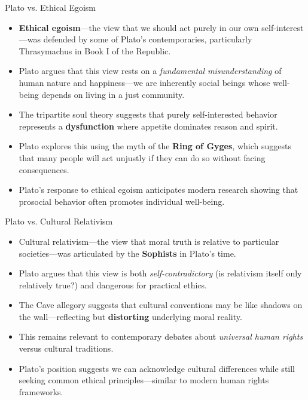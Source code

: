 \documentclass[aspectratio=169]{beamer}
\begin{document}
\begin{frame}{Plato vs. Ethical Egoism}
\begin{itemize}
\item \textbf{Ethical egoism}—the view that we should act purely in our own self-interest—was defended by some of Plato's contemporaries, particularly Thrasymachus in Book I of the Republic.
\item Plato argues that this view rests on a \emph{fundamental misunderstanding} of human nature and happiness—we are inherently social beings whose well-being depends on living in a just community.
\item The tripartite soul theory suggests that purely self-interested behavior represents a \textbf{dysfunction} where appetite dominates reason and spirit.
\item Plato explores this using the myth of the \textbf{Ring of Gyges}, which suggests that many people will act unjustly if they can do so without facing consequences.
\item Plato's response to ethical egoism anticipates modern research showing that prosocial behavior often promotes individual well-being.
\end{itemize}
\end{frame}

\begin{frame}{Plato vs. Cultural Relativism}
\begin{itemize}
\item Cultural relativism—the view that moral truth is relative to particular societies—was articulated by the \textbf{Sophists} in Plato's time.
\item Plato argues that this view is both \emph{self-contradictory} (is relativism itself only relatively true?) and dangerous for practical ethics.
\item The Cave allegory suggests that cultural conventions may be like shadows on the wall—reflecting but \textbf{distorting} underlying moral reality.
\item This remains relevant to contemporary debates about \emph{universal human rights} versus cultural traditions.
\item Plato's position suggests we can acknowledge cultural differences while still seeking common ethical principles—similar to modern human rights frameworks.
\end{itemize}
\end{frame}
\end{document}
